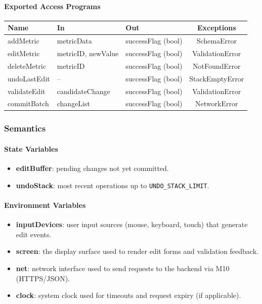 \documentclass[12pt, titlepage]{article}
\begin{document}
  \paragraph{Exported Access Programs}
  \begin{center}
  \renewcommand{\arraystretch}{1.15}
  \begin{tabularx}{\textwidth}{l X X c}
  \toprule
  \textbf{Name} & \textbf{In} & \textbf{Out} & \textbf{Exceptions}\\
  \midrule
  addMetric & metricData & successFlag (bool) & SchemaError \\
  editMetric & metricID, newValue & successFlag (bool) & ValidationError \\
  deleteMetric & metricID & successFlag (bool)& NotFoundError \\
  undoLastEdit & -- & successFlag (bool)& StackEmptyError \\
  validateEdit & candidateChange & successFlag (bool) & ValidationError \\
  commitBatch & changeList & successFlag (bool) & NetworkError \\
  \bottomrule
  \end{tabularx}
  \end{center}

  \subsubsection{Semantics}

  \paragraph{State Variables}
  \begin{itemize}
    \item \textbf{editBuffer}: pending changes not yet committed.
    \item \textbf{undoStack}: most recent operations up to \texttt{UNDO\_STACK\_LIMIT}.
  \end{itemize}

  \paragraph{Environment Variables}
  \begin{itemize}
    \item \textbf{inputDevices}: user input sources (mouse, keyboard, touch) that generate edit events.
    \item \textbf{screen}: the display surface used to render edit forms and validation feedback.
    \item \textbf{net}: network interface used to send requests to the backend via M10 (HTTPS/JSON).
    \item \textbf{clock}: system clock used for timeouts and request expiry (if applicable).
  \end{itemize}
\end{document}
